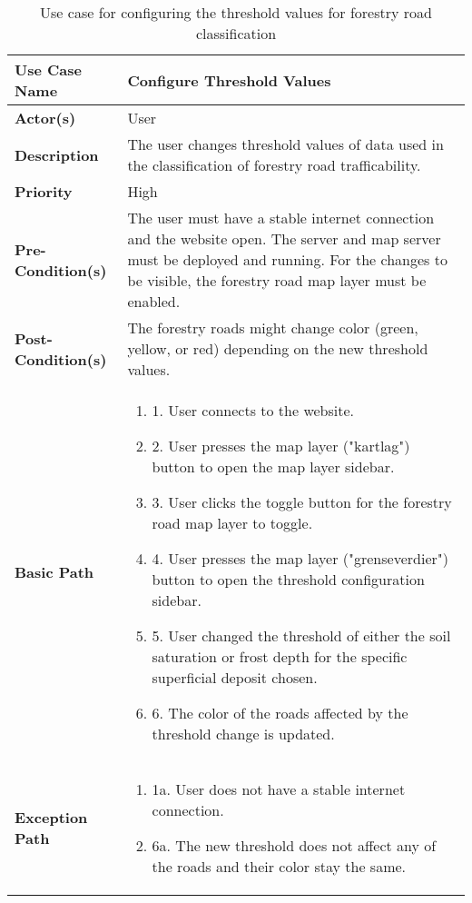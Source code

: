 \begin{table}[h]
    \centering
    \renewcommand{\arraystretch}{1.5}
    \begin{tabularx}{\textwidth}{|l|X|}
        \hline
        \rowcolor{gray!20}
        \textbf{Use Case Name} & Configure Threshold Values \\
        \hline
        \textbf{Actor(s)} & User \\
        \hline
        \textbf{Description} & The user changes threshold values of data used in the classification of forestry road trafficability. \\
        \hline
        \textbf{Priority} & High \\
        \hline
        \textbf{Pre-Condition(s)} & The user must have a stable internet connection and the website open. The server and map server must be deployed and running. For the changes to be visible, the forestry road map layer must be enabled. \\
        \hline
        \textbf{Post-Condition(s)} & The forestry roads might change color (green, yellow, or red) depending on the new threshold values. \\
        \hline
        \textbf{Basic Path} &  
        \begin{enumerate}[label=,left=0pt]
            \item 1. User connects to the website. 
            \item 2. User presses the map layer ("kartlag") button to open the map layer sidebar.
            \item 3. User clicks the toggle button for the forestry road map layer to toggle.
            \item 4. User presses the map layer ("grenseverdier") button to open the threshold configuration sidebar.
            \item 5. User changed the threshold of either the soil saturation or frost depth for the specific superficial deposit chosen.
            \item 6. The color of the roads affected by the threshold change is updated.
        \end{enumerate} \\
        \hline
        \textbf{Exception Path} & 
        \begin{enumerate}[label=,left=0pt]
            \item 1a. User does not have a stable internet connection.
            \item 6a. The new threshold does not affect any of the roads and their color stay the same.
        \end{enumerate} \\
        \hline
    \end{tabularx}
    \caption*{Use case for configuring the threshold values for forestry road classification}
    \label{tab:use_case_base_layer_appendix}
\end{table}

